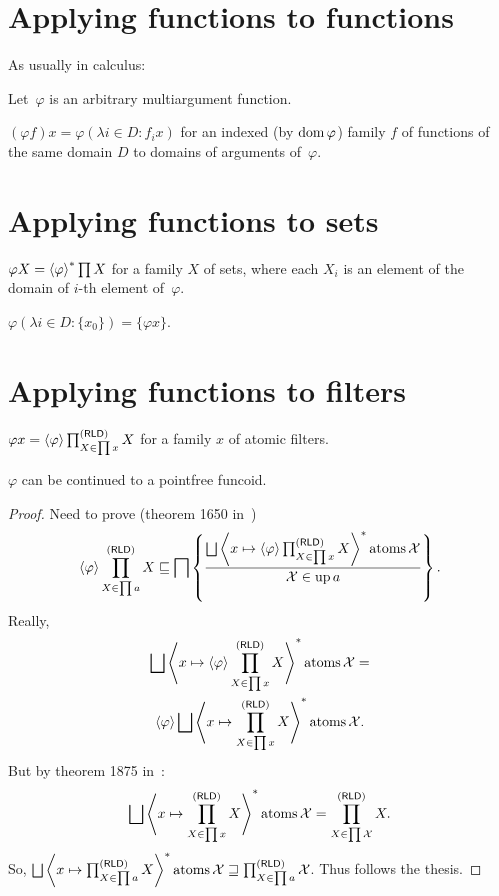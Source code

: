 \section{Applying functions to functions}

As usually in calculus:

Let~$\varphi$ is an arbitrary multiargument function.

\begin{defn}
$(\varphi f) x = \varphi (\lambda i \in D : f_i x)$
for an indexed (by $\operatorname{dom}\varphi$) family $f$ of functions of the same domain $D$ to domains of arguments of~$\varphi$.
\end{defn}

\section{Applying functions to sets}

\begin{defn}
  $\varphi X = \left\langle \varphi\right\rangle ^{\ast} \prod X$ for a family $X$ of sets, where each $X_i$ is an element of the domain of $i$-th element of~$\varphi$.
\end{defn}

\begin{obvious}
$\varphi (\lambda i \in D : \{ x_0 \}) = \{ \varphi x \}$.
\end{obvious}

\section{Applying functions to filters}

\begin{defn}
  $\varphi x = \left\langle \varphi\right\rangle \prod^{(\mathsf{RLD})}_{X \in \prod x} X$ for a
  family $x$ of atomic filters.
\end{defn}

\begin{prop}
  $\varphi$ can be continued to a pointfree funcoid.
\end{prop}

\begin{proof}
  Need to prove (theorem 1650 in~\cite{volume-1-edition1})
  \[ \supfun{\varphi} \prod^{\reloids}_{X \in \prod a} X \sqsubseteq \bigsqcap
     \setcond{\bigsqcup \rsupfun{x \mapsto \supfun{\varphi}
     \prod^{\reloids}_{X \in \prod x} X} \atoms \mathcal{X}}{\mathcal{X} \in
     \up a} . \]
  Really,
\begin{multline*}
\bigsqcup \rsupfun{x \mapsto \supfun{\varphi} \prod^{\reloids}_{X \in
     \prod x} X} \atoms \mathcal{X} =\\ \supfun{\varphi} \bigsqcup \rsupfun{x
     \mapsto \prod^{\reloids}_{X \in \prod x} X} \atoms \mathcal{X} .
\end{multline*}
  But by theorem 1875 in~\cite{volume-1-edition1}:
  \[ \bigsqcup \rsupfun{x \mapsto \prod^{\reloids}_{X \in \prod x} X}
     \atoms \mathcal{X} = \prod^{\reloids}_{X \in \prod \mathcal{X}}
     X . \]
  So, $\bigsqcup \rsupfun{x \mapsto \prod^{\reloids}_{X \in \prod a} X}
  \atoms \mathcal{X} \sqsupseteq \prod^{\reloids}_{X \in \prod a}
  \mathcal{X}$. Thus follows the thesis.
\end{proof}


